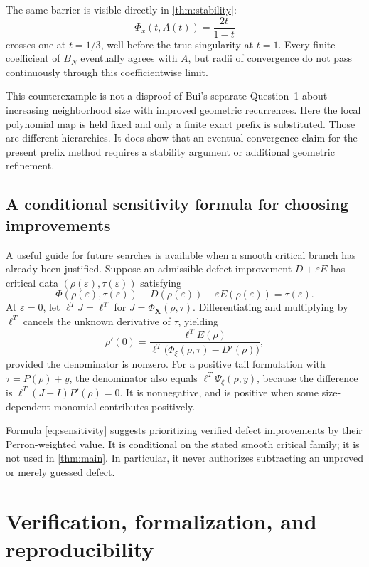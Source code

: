 \documentclass[11pt,a4paper]{article}
\theoremstyle{definition}
\theoremstyle{remark}
\newcommand{\bX}{\boldsymbol X}
\begin{document}
The same barrier is visible directly in \cref{thm:stability}:
\[
 \Phi_x(t,A(t))=\frac{2t}{1-t}
\]
crosses one at $t=1/3$, well before the true singularity at $t=1$.
Every finite coefficient of $B_N$ eventually agrees with $A$, but radii of
convergence do not pass continuously through this coefficientwise limit.

This counterexample is not a disproof of Bui's separate Question~1 about
increasing neighborhood size with improved geometric recurrences. Here the
local polynomial map is held fixed and only a finite exact prefix is
substituted. Those are different hierarchies. It does show that an eventual
convergence claim for the present prefix method requires a stability argument
or additional geometric refinement.

\subsection{A conditional sensitivity formula for choosing improvements}
A useful guide for future searches is available when a smooth critical branch
has already been justified. Suppose an admissible defect improvement
$D+\varepsilon E$ has critical data $(\rho(\varepsilon),\tau(\varepsilon))$
satisfying
\[
 \Phi(\rho(\varepsilon),\tau(\varepsilon))
 -D(\rho(\varepsilon))-\varepsilon E(\rho(\varepsilon))
 =\tau(\varepsilon).
\]
At $\varepsilon=0$, let $\ell^TJ=\ell^T$ for
$J=\Phi_{\bX}(\rho,\tau)$. Differentiating and multiplying by $\ell^T$
cancels the unknown derivative of $\tau$, yielding
\begin{equation}\label{eq:sensitivity}
 \rho'(0)=
 \frac{\ell^TE(\rho)}
      {\ell^T\bigl(\Phi_\xi(\rho,\tau)-D'(\rho)\bigr)},
\end{equation}
provided the denominator is nonzero.
For a positive tail formulation with $\tau=P(\rho)+y$, the denominator
also equals $\ell^T\Psi_\xi(\rho,y)$, because the difference is
$\ell^T(J-I)P'(\rho)=0$. It is nonnegative, and is positive when some
size-dependent monomial contributes positively.

Formula \eqref{eq:sensitivity} suggests prioritizing verified defect
improvements by their Perron-weighted value. It is conditional on the stated
smooth critical family; it is not used in \cref{thm:main}. In particular,
it never authorizes subtracting an unproved or merely guessed defect.

\section{Verification, formalization, and reproducibility}
\label{sec:verification}
\end{document}
